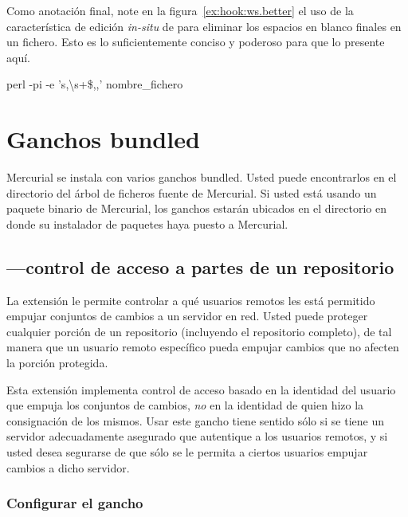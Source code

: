 Como anotación final, note en la figura~\ref{ex:hook:ws.better} el
uso de la característica de edición \emph{in-situ} de 
para eliminar los espacios en blanco finales en un fichero. Esto es
lo suficientemente conciso y poderoso para que lo presente aquí.
\begin{codesample2}
    perl -pi -e 's,\textbackslash{}s+\$,,' nombre\_fichero
\end{codesample2}

\section{Ganchos bundled}

Mercurial se instala con varios ganchos bundled. Usted puede
encontrarlos en el directorio  del árbol de ficheros
fuente de Mercurial. Si usted está usando un paquete binario de
Mercurial, los ganchos estarán ubicados en el directorio
 en donde su instalador de paquetes haya puesto a
Mercurial.

\subsection{---control de acceso a partes de un repositorio}

La extensión  le permite controlar a qué usuarios remotos
les está permitido empujar conjuntos de cambios a un servidor en red.
Usted puede proteger cualquier porción de un repositorio (incluyendo
el repositorio completo), de tal manera que un usuario remoto
específico pueda empujar cambios que no afecten la porción protegida.

Esta extensión implementa control de acceso basado en la identidad del
usuario que empuja los conjuntos de cambios, \emph{no} en la identidad
de quien hizo la consignación de los mismos. Usar este gancho tiene
sentido sólo si se tiene un servidor adecuadamente asegurado que
autentique a los usuarios remotos, y si usted desea segurarse de que
sólo se le permita a ciertos usuarios empujar cambios a dicho
servidor.

\subsubsection{Configurar el gancho }

